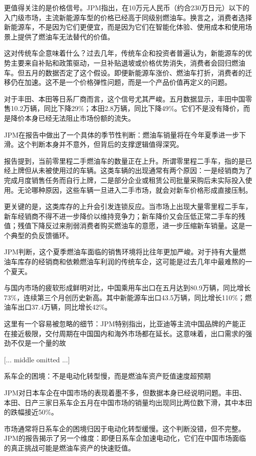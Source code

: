 \documentclass[11pt]{ctexart}
\begin{document}
更值得关注的是价格信号。JPM指出，在10万元人民币（约合230万日元）以下的入门级市场，主流新能源车型的价格已经高于同级别燃油车。换言之，消费者选择新能源车，不是因为它们更便宜，而是因为它们在智能化体验、使用成本和使用场景上提供了燃油车无法替代的价值。

这对传统车企意味着什么？过去几年，传统车企和投资者普遍认为，新能源车的优势主要来自补贴和政策驱动，一旦补贴退坡或价格优势消失，消费者会回归燃油车。但五月的数据否定了这个假设。即便新能源车涨价、燃油车打折，消费者的迁移仍在加速。这不是一个价格弹性问题，而是一个产品价值再定义的问题。

对于丰田、本田等日系厂商而言，这个信号尤其严峻。五月数据显示，丰田中国零售10.2万辆，同比下降29\%；本田2.8万辆，同比下降49\%。它们不是没有降价，而是降价本身已经无法阻止市场份额的流失。

JPM在报告中做出了一个具体的季节性判断：燃油车销量将在今年夏季进一步下滑。这个判断本身并不意外，但背后的支撑逻辑值得深究。

报告提到，当前零里程二手燃油车的数量正在上升。所谓零里程二手车，指的是已经上牌但从未被使用过的车辆。这类车辆的出现通常有两个原因：一是经销商为了完成月度销售任务而自行上牌，二是部分企业或租赁公司批量采购后未实际投入使用。无论哪种原因，这些车辆一旦进入二手市场，就会对新车价格形成直接压制。

更关键的是，这类库存的上升会引发连锁反应。当市场上出现大量零里程二手车，新车经销商不得不进一步降价以维持竞争力；新车降价又会压低正常二手车的残值；残值下降反过来削弱消费者购买燃油车的意愿，进一步压缩新车销量。这是一个典型的负反馈循环。

JPM判断，这个夏季燃油车面临的销售环境将比往年更加严峻。对于持有大量燃油车库存的经销商和依赖燃油车利润的传统车企，这可能是过去几年中最难熬的一个夏天。

与国内市场的疲软形成鲜明对比，中国乘用车出口在五月达到80.9万辆，同比增长73\%，连续第三个月创历史新高。其中新能源车出口43.5万辆，同比增长110\%；燃油车出口37.4万辆，同比增长42\%。

这里有一个容易被忽略的细节：JPM特别指出，比亚迪等主流中国品牌的产能正在接近极限，交付周期在中国国内和海外市场都在延长。这意味着，出口需求的强劲不仅是一个量的故

[... middle omitted ...]

系车企的困境：不是电动化转型慢，而是燃油车资产贬值速度超预期

JPM对日本车企在中国市场的表现着墨不多，但数据本身已经说明问题。丰田、本田、日产三家日系车企五月在中国市场的销量均出现同比两位数下滑，其中本田的跌幅接近50\%。

市场通常将日系车企的困境归因于电动化转型缓慢。这个判断没错，但不完整。JPM的报告揭示了另一个维度：即便日系车企加速电动化，它们在中国市场面临的真正挑战可能是燃油车资产的快速贬值。
\end{document}
